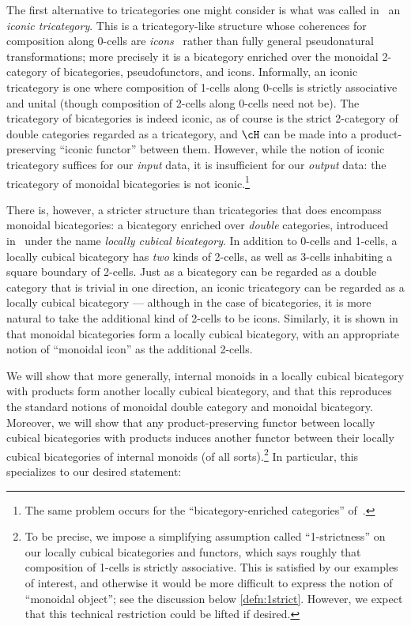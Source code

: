 The first alternative to tricategories one might consider is what was called in~\cite{shulman:psalg} an \emph{iconic tricategory}.
This is a tricategory-like structure whose coherences for composition along 0-cells are \emph{icons}~\cite{lack:icons} rather than fully general pseudonatural transformations; more precisely it is a bicategory enriched over the monoidal 2-category of bicategories, pseudofunctors, and icons.
Informally, an iconic tricategory is one where composition of 1-cells along 0-cells is strictly associative and unital (though composition of 2-cells along 0-cells need not be).
The tricategory of bicategories is indeed iconic, as of course is the strict 2-category of double categories regarded as a tricategory, and $\cH$ can be made into a product-preserving ``iconic functor'' between them.
However, while the notion of iconic tricategory suffices for our \emph{input} data, it is insufficient for our \emph{output} data: the tricategory of monoidal bicategories is not iconic.\footnote{The same problem occurs for the ``bicategory-enriched categories'' of~\cite{verity:base-change}.}

There is, however, a stricter structure than tricategories that does encompass monoidal bicategories: a bicategory enriched over \emph{double} categories, introduced in~\cite{gg:ldstr-tricat} under the name \emph{locally cubical bicategory}.
In addition to 0-cells and 1-cells, a locally cubical bicategory has \emph{two} kinds of 2-cells, as well as 3-cells inhabiting a square boundary of 2-cells.
Just as a bicategory can be regarded as a double category that is trivial in one direction, an iconic tricategory can be regarded as a locally cubical bicategory --- although in the case of bicategories, it is more natural to take the additional kind of 2-cells to be icons.
Similarly, it is shown in~\cite{gg:ldstr-tricat} that monoidal bicategories form a locally cubical bicategory, with an appropriate notion of ``monoidal icon'' as the additional 2-cells.

We will show that more generally, internal monoids in a locally cubical bicategory with products form another locally cubical bicategory, and that this reproduces the standard notions of monoidal double category and monoidal bicategory.
Moreover, we will show that any product-preserving functor between locally cubical bicategories with products induces another functor between their locally cubical bicategories of internal monoids (of all sorts).\footnote{To be precise, we impose a simplifying assumption called ``1-strictness'' on our locally cubical bicategories and functors, which says roughly that composition of 1-cells is strictly associative.
  This is satisfied by our examples of interest, and otherwise it would be more difficult to express the notion of ``monoidal object''; see the discussion below \autoref{defn:1strict}.
  However, we expect that this technical restriction could be lifted if desired.}
In particular, this specializes to our desired statement:

